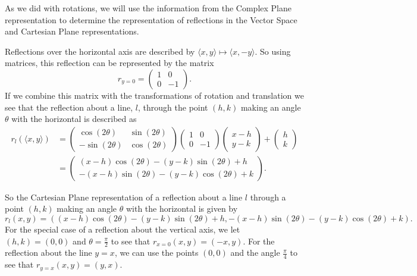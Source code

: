 \documentclass[
]{book}
\theoremstyle{definition}
\theoremstyle{definition}
\theoremstyle{definition}
\theoremstyle{definition}
\theoremstyle{remark}
\begin{document}
As we did with rotations, we will use the information from the Complex Plane representation to determine the representation of reflections in the Vector Space and Cartesian Plane representations.

Reflections over the horizontal axis are described by \(\langle x,y \rangle \mapsto \langle x,-y\rangle\). So using matrices, this reflection can be represented by the matrix \[r_{y=0} = \begin{pmatrix} 1 & 0 \\ 0 & -1 \end{pmatrix}.\] If we combine this matrix with the transformations of rotation and translation we see that the reflection about a line, \(l\), through the point \((h,k)\) making an angle \(\theta\) with the horizontal is described as
\begin{align*}
r_l (\langle x,y\rangle ) &= \begin{pmatrix} \cos(2\theta) & \sin(2\theta) \\ -\sin(2\theta) & \cos(2\theta) \end{pmatrix} \begin{pmatrix} 1 & 0 \\ 0 & -1 \end{pmatrix} \begin{pmatrix} x-h \\ y-k \end{pmatrix}  + \begin{pmatrix} h \\ k \end{pmatrix} \\
&= \begin{pmatrix} (x-h) \cos(2\theta) - (y-k)\sin(2\theta) +h \\ -(x-h) \sin(2\theta) - (y-k)\cos(2\theta) +k \end{pmatrix} .\end{align*}

So the Cartesian Plane representation of a reflection about a line \(l\) through a point \((h,k)\) making an angle \(\theta\) with the horizontal is given by
\[r_{l} (x,y) = \left( (x-h) \cos(2\theta) - (y-k)\sin(2\theta) +h,   -(x-h) \sin(2\theta) - (y-k)\cos(2\theta) +k    \right) .\]
For the special case of a reflection about the vertical axis, we let \((h,k)=(0,0)\) and \(\theta=\frac{\pi}{2}\) to see that
\(r_{x=0} (x,y) = (-x,y)\). For the reflection about the line \(y=x\), we can use the points \((0,0)\) and the angle \(\frac{\pi}{4}\) to see that \(r_{y=x}(x,y) = (y,x)\).
\end{document}
